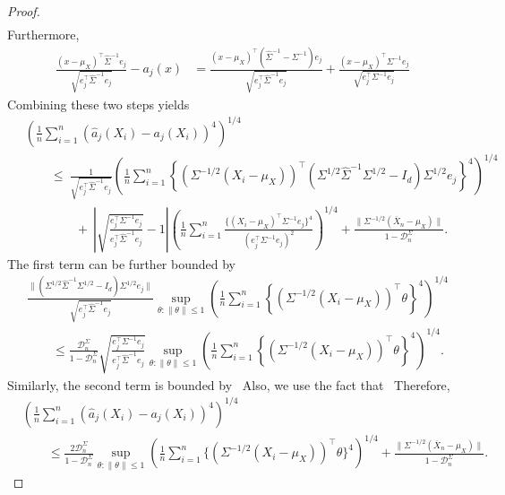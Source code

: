 \documentclass{article}
\begin{document}
\begin{appendices}
\begin{proof}
\begin{align*}
\end{align*}
Furthermore,
\begin{align*}
\frac{(x - \mu_X)^{\top}\widehat{\Sigma}^{-1}e_j}{\sqrt{e_j^{\top}\widehat{\Sigma}^{-1}e_j}} - a_j(x) &= \frac{(x - \mu_X)^{\top}(\widehat{\Sigma}^{-1} - \Sigma^{-1})e_j}{\sqrt{e_j^{\top}\widehat{\Sigma}^{-1}e_j}} + \frac{(x - \mu_X)^{\top}\Sigma^{-1}e_j}{\sqrt{e_j^{\top}\Sigma^{-1}e_j}}\left.
\end{align*}
Combining these two steps yields
\begin{align*}
&\left(\frac{1}{n}\sum_{i=1}^n (\widehat{a}_j(X_i) - a_j(X_i))^4\right)^{1/4}\\ ~&\qquad\le~ \frac{1}{\sqrt{e_j^{\top}\widehat{\Sigma}^{-1}e_j}}\left(\frac{1}{n}\sum_{i=1}^n \left\{(\Sigma^{-1/2}(X_i - \mu_X))^{\top}(\Sigma^{1/2}\widehat{\Sigma}^{-1}\Sigma^{1/2} - I_d)\Sigma^{1/2}e_j\right\}^4\right)^{1/4}\\ ~&\qquad\qquad+~ \left|\sqrt{\frac{e_j^{\top}\Sigma^{-1}e_j}{e_j^{\top}\widehat{\Sigma}^{-1}e_j}} - 1\right|\left(\frac{1}{n}\sum_{i=1}^n \frac{\{(X_i - \mu_X)^{\top}\Sigma^{-1}e_j\}^4}{(e_j^{\top}\Sigma^{-1}e_j)^2}\right)^{1/4} + \frac{\|\Sigma^{-1/2}(\overline{X}_n - \mu_X)\|}{1 - \mathcal{D}_n^{\Sigma}}.
\end{align*}
The first term can be further bounded by
\begin{align*}
&\frac{\|(\Sigma^{1/2}\widehat{\Sigma}^{-1}\Sigma^{1/2} - I_d)\Sigma^{1/2}e_j\|}{\sqrt{e_j^{\top}\widehat{\Sigma}^{-1}e_j}}\sup_{\theta:\|\theta\| \le 1}\left(\frac{1}{n}\sum_{i=1}^n \left\{(\Sigma^{-1/2}(X_i - \mu_X))^{\top}\theta\right\}^4\right)^{1/4}\\ &\qquad\le \frac{\mathcal{D}_n^{\Sigma}}{1 - \mathcal{D}_n^{\Sigma}}\sqrt{\frac{e_j^{\top}\Sigma^{-1}e_j}{e_j^{\top}\widehat{\Sigma}^{-1}e_j}}\sup_{\theta:\|\theta\| \le 1}\left(\frac{1}{n}\sum_{i=1}^n \left\{(\Sigma^{-1/2}(X_i - \mu_X))^{\top}\theta\right\}^4\right)^{1/4}.
\end{align*}
Similarly, the second term is bounded by
\ Also, we use the fact that
\ Therefore,
\begin{align*}
&\left(\frac{1}{n}\sum_{i=1}^n (\widehat{a}_j(X_i) - a_j(X_i))^4\right)^{1/4}\\ &\qquad\le \frac{2\mathcal{D}_n^{\Sigma}}{1 - \mathcal{D}_n^{\Sigma}}\sup_{\theta:\|\theta\| \le 1}\left(\frac{1}{n}\sum_{i=1}^n{\{(\Sigma^{-1/2}(X_i - \mu_X))^{\top}\theta\}^4}\right)^{1/4} + \frac{\|\Sigma^{-1/2}(\overline{X}_n - \mu_X)\|}{1 - \mathcal{D}_n^{\Sigma}}.
\end{align*}

\end{proof}
\end{appendices}
\end{document}
